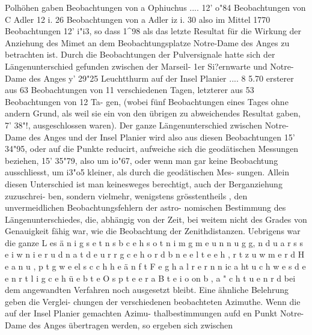 \documentclass[12pt,a4paper]{article}
\begin{document}
Polhöhen gaben Beobachtungen von a Ophiuchus .... 12' o"84 Beobachtungen von C Adler 12 i. 26 Beobachtungen von a Adler iz i. 30\newline
also im Mittel 1770 Beobachtungen 12' i"i3, so dass 1\^{}98 als das letzte Resultat für die Wirkung der\newline
Anziehung des Mimet an dem Beobachtungsplatze Notre-Dame des Anges zu betrachten ist. Durch\newline
die Beobachtungen der Pulversignale hatte sich der Längenunterschied gefunden zwischen der Marseil-\newline
1er Si?ernwarte und\newline
Notre-Dame des Anges y' 29"25\newline
Leuchtthurm auf der Insel Planier .... 8 5.70\newline
ersterer aus 63 Beobachtungen von 11 verschiedenen Tagen, letzterer aus 53 Beobachtungen von 12 Ta-\newline
gen, (wobei fünf Beobachtungen eines Tages ohne andern Grund, als weil sie ein von den übrigen zu\newline
abweichendes Resultat gaben, 7' 38"!, ausgeschlossen waren). Der ganze Längenunterschied zwischen\newline
Notre-Dame des Anges und der Insel Planier wird also aus diesen Beobachtungen 15' 34"95, oder auf\newline
die Punkte reducirt, aufweiche sich die geodätischen Messungen beziehen, 15' 35"79, also um io"67,\newline
oder wenn man gar keine Beobachtung ausschliesst, um i3"o5 kleiner, als durch die geodätischen Mes-\newline
sungen. Allein diesen Unterschied ist man keinesweges berechtigt, auch der Berganziehung zuzuschrei-\newline
ben, sondern vielmehr, wenigstens grösstentheils , den unvermeidlichen Beobachtungsfehlern der astro-\newline
nomischen Bestimmung des Längenunterschiedes, die, abhängig von der Zeit, bei weitem nicht des\newline
Grades von Genauigkeit fähig war, wie die Beobachtung der Zenithdistanzen. Uebrigens war die ganze\newline
L es ä n i g s e t n s b c e h s o t n i m g m e u n n u g g, n d u a r s s e i w n i e r u d n a t d e u r r g c e h o r d b n e e l t e e h , r t z u w m e r d H e a n u , p t g w e el s c c h h e ä n f t F e g h a l r e r n n ic a ht u c h w e s d e e n r t l i g c e h ü e b t e O s p t e e r a B t e i o on b , a " c h t u e n r d\newline
bei dem angewandten Verfahren noch ausgesetzt bleibt. Eine ähnliche Belehrung geben die Verglei-\newline
chungen der verschiedenen beobachteten Azimuthe. Wenn die auf der Insel Planier gemachten Azimu-\newline
thalbestimmungen aufd en Punkt Notre-Dame des Anges übertragen werden, so ergeben sich zwischen\newline
\end{document}
